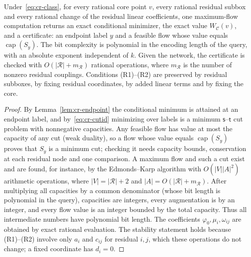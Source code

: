 \begin{theorem}\label{thm:cr-oracle}
Under~\eqref{eq:cr-class}, for every rational core point $v$, every
rational residual subbox and every rational change of the residual linear
coefficients, one maximum-flow computation returns an exact conditional
minimizer, the exact value $W_{\mathcal C}(v)$, and a certificate: an
endpoint label $y$ and a feasible flow whose value equals
$\operatorname{cap}(S_y)$. The bit complexity is polynomial in the
encoding length of the query, with an absolute exponent independent of
$k$. Given the network, the certificate is checked with
$O(|\mathcal R|+m_{\mathcal R})$ rational operations, where $m_{\mathcal R}$
is the number of nonzero residual couplings. Conditions (R1)--(R2) are
preserved by residual subboxes, by fixing residual coordinates, by added
linear terms and by fixing the core.
\end{theorem}
\begin{proof}
By Lemma~\ref{lem:cr-endpoint} the conditional minimum is attained at an
endpoint label, and by~\eqref{eq:cr-cutid} minimizing over labels is a
minimum $\mathsf s$--$\mathsf t$ cut problem with nonnegative capacities.
Any feasible flow has value at most the capacity of any cut (weak
duality), so a flow whose value equals $\operatorname{cap}(S_y)$ proves
that $S_y$ is a minimum cut; checking it needs capacity bounds,
conservation at each residual node and one comparison. A maximum flow and
such a cut exist and are found, for instance, by the Edmonds--Karp
algorithm with $O(|V||A|^2)$ arithmetic operations, where
$|V|=|\mathcal R|+2$ and $|A|=O(|\mathcal R|+m_{\mathcal R})$. After
multiplying all capacities by a common denominator (whose bit length is
polynomial in the query), capacities are integers, every augmentation is
by an integer, and every flow value is an integer bounded by the total
capacity. Thus all intermediate numbers have polynomial bit length. The
coefficients $\varphi_0,\mu_i,\omega_{ij}$ are obtained by exact
rational evaluation. The stability statement holds because (R1)--(R2)
involve only $a_i$ and $c_{ij}$ for residual $i,j$, which these operations
do not change; a fixed coordinate has $d_i=0$.
\end{proof}

